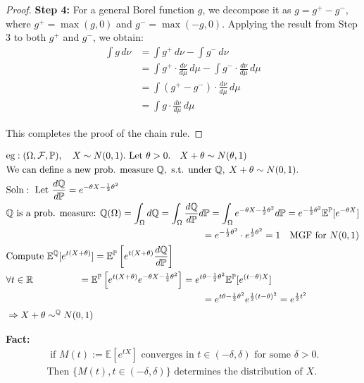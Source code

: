 \begin{proof}
    \textbf{Step 4:} For a general Borel function $g$, we decompose it as $g = g^+ - g^-$, where $g^+ = \max(g, 0)$ and $g^- = \max(-g, 0)$. Applying the result from Step 3 to both $g^+$ and $g^-$, we obtain:
    \begin{align*}
    \int g \, d\nu &= \int g^+ \, d\nu - \int g^- \, d\nu\\
    &= \int g^+ \cdot \frac{d\nu}{d\mu} \, d\mu - \int g^- \cdot \frac{d\nu}{d\mu} \, d\mu\\
    &= \int (g^+ - g^-) \cdot \frac{d\nu}{d\mu} \, d\mu\\
    &= \int g \cdot \frac{d\nu}{d\mu} \, d\mu
    \end{align*}
    
    This completes the proof of the chain rule.
    \end{proof}
\begin{example}[]{}
    \begin{align*}
        &\text{eg}: (\Omega, \mathcal{F}, \mathbb{P}), \quad X \sim N(0,1). \text{ Let } \theta > 0. \quad X + \theta \sim N(\theta, 1)\\
        &\text{We can define a new prob. measure } \mathbb{Q}, \text{ s.t. under } \mathbb{Q}, \; X + \theta \sim N(0,1).\\
        &\text{Soln}: \text{ Let } \frac{d\mathbb{Q}}{d\mathbb{P}} = e^{-\theta X - \frac{1}{2}\theta^2}\\
        &\mathbb{Q} \text{ is a prob. measure: } \mathbb{Q}(\Omega) = \int_{\Omega} d\mathbb{Q} = \int_{\Omega} \frac{d\mathbb{Q}}{d\mathbb{P}}d\mathbb{P} = \int_{\Omega} e^{-\theta X - \frac{1}{2}\theta^2}d\mathbb{P} = e^{-\frac{1}{2}\theta^2}\mathbb{E}^{\mathbb{P}}[e^{-\theta X}]\\
        &\hspace{7.3cm} = e^{-\frac{1}{2}\theta^2} \cdot e^{\frac{1}{2}\theta^2} = 1 \quad \text{MGF for } N(0,1)\\
        &\text{Compute } \mathbb{E}^{\mathbb{Q}}[e^{t(X+\theta)}] = \mathbb{E}^{\mathbb{P}}\left[e^{t(X+\theta)}\frac{d\mathbb{Q}}{d\mathbb{P}}\right]\\
        &\forall t \in \mathbb{R} \hspace{1.7cm} = \mathbb{E}^{\mathbb{P}}\left[e^{t(X+\theta)}e^{-\theta X - \frac{1}{2}\theta^2}\right] = e^{t\theta - \frac{1}{2}\theta^2}\mathbb{E}^{\mathbb{P}}[e^{(t-\theta)X}]\\
        &\hspace{7.3cm} = e^{t\theta - \frac{1}{2}\theta^2}e^{\frac{1}{2}(t-\theta)^2} = e^{\frac{1}{2}t^2}\\
        &\Rightarrow X+\theta \sim^{\mathbb{Q}} N(0,1)
        \end{align*}
\end{example}
\textbf{Fact:}
\begin{align*}
    \text{ if } M(t):=\mathbb{E}[e^{tX}] \text{ converges in } t \in (-\delta,\delta) \text{ for some } \delta > 0.\\
    \text{Then } \{M(t), t \in (-\delta,\delta)\} \text{ determines the distribution of } X.
    \end{align*}
